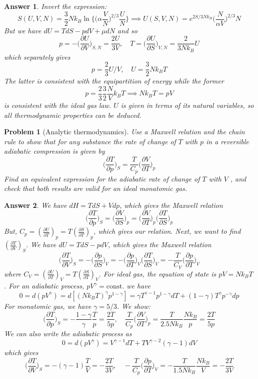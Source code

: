 \documentclass[a4paper]{article}
\newtheorem{ans}{Answer}[section]
\theoremstyle{new}
\newtheorem{qns}{Problem}[section]
\begin{document}
\begin{ans}
Invert the expression:
$$S(U,V,N)=\frac{3}{2}Nk_B\ln\bigg\{\bigg(\alpha\frac{V}{N}\bigg)^{2/3}\frac{U}{N}\bigg\}\implies U(S,V,N)=e^{2S/3Nk_B}\bigg(\frac{N}{\alpha V}\bigg)^{2/3}N$$
But we have $dU=TdS-pdV+\mu dN$ and so
$$p=-\bigg(\frac{\partial U}{\partial V}\bigg)_{S,N}=\frac{2U}{3V},\quad T=\bigg(\frac{\partial U}{\partial S}\bigg)_{V,N}=\frac{2}{3Nk_B}U$$
which separately gives 
$$p=\frac{2}{3}U/V,\quad U=\frac{3}{2}Nk_BT$$
The latter is consistent with the equipartition of energy while the former
$$p=\frac{2}{3}\frac{3}{2}\frac{N}{V}k_BT\implies Nk_BT=pV$$
is consistent with the ideal gas law. $U$ is given in terms of its natural variables, so all thermodynamic properties can be deduced.
\end{ans}
\newpage
\begin{qns}[Analytic thermodynamics]
Use a Maxwell relation and the chain rule to show that for any substance the rate of change of $T$ with $p$ in a reversible adiabatic compression is given by
$$\bigg(\frac{\partial T}{\partial p}\bigg)_S=\frac{T}{C_p}\bigg(\frac{\partial V}{\partial T}\bigg)_p$$
Find an equivalent expression for the adiabatic rate of change of $T$ with $V$ , and check that both results are valid for an ideal monatomic gas.
\end{qns}
\begin{ans}
We have $dH=TdS+Vdp$, which gives the Maxwell relation
$$\bigg(\frac{\partial T}{\partial p}\bigg)_S=\bigg(\frac{\partial V}{\partial S}\bigg)_p=\bigg(\frac{\partial V}{\partial T}\bigg)_p\bigg(\frac{\partial T}{\partial S}\bigg)_p$$
But, $C_p=(\frac{\partial U}{\partial T})_p=T(\frac{\partial S}{\partial T})_p$, which gives our relation. Next, we want to find $(\frac{\partial T}{\partial V})_S$. We have $dU=TdS-pdV$, which gives the Maxwell relation
$$\bigg(\frac{\partial T}{\partial V}\bigg)_S=-\bigg(\frac{\partial p}{\partial S}\bigg)_V=-\bigg(\frac{\partial p}{\partial T}\bigg)_V\bigg(\frac{\partial T}{\partial S}\bigg)_V=-\frac{T}{C_V}\bigg(\frac{\partial p}{\partial T}\bigg)_V$$
where $C_V=(\frac{\partial U}{\partial T})_V=T(\frac{\partial S}{\partial T})_V$. For ideal gas, the equation of state is $pV=Nk_BT$. For an adiabatic process, $pV^\gamma=\text{const.}$ we have
$$0=d(pV^\gamma)=d[(Nk_BT)^\gamma p^{1-\gamma}]=\gamma T^{\gamma-1}p^{1-\gamma}dT+(1-\gamma)T^\gamma p^{-\gamma}dp$$
For monatomic gas, we have $\gamma=5/3$. We show:
$$\bigg(\frac{\partial T}{\partial p}\bigg)_S=-\frac{1-\gamma}{\gamma}\frac{T}{p}=\frac{2T}{5p},\quad \frac{T}{C_p}\bigg(\frac{\partial V}{\partial T}\bigg)_p=\frac{T}{2.5Nk_B}\frac{Nk_B}{p}=\frac{2T}{5p}$$
We can also write the adiabatic process as
$$0=d(pV^\gamma)=V^{\gamma-1}dT+TV^{\gamma-2}(\gamma-1)dV$$
which gives
$$\bigg(\frac{\partial T}{\partial V}\bigg)_S=-(\gamma-1)\frac{T}{V}=-\frac{2T}{3V},\quad -\frac{T}{C_p}\bigg(\frac{\partial p}{\partial T}\bigg)_V=-\frac{T}{1.5Nk_B}\frac{Nk_B}{V}=-\frac{2T}{3V}$$
\end{ans}
\end{document}
